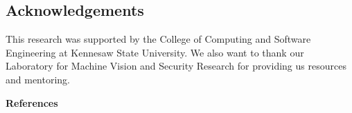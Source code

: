 \documentclass[a4paper,10pt]{article}
\begin{document}

\subsection*{Acknowledgements}
This research was supported by the College of Computing and Software Engineering
at Kennesaw State University. We also want to thank our Laboratory for Machine
Vision and Security Research for providing us resources and mentoring.

\vspace{5mm}

\begin{center}
      {\large \bf References}
\end{center}



\end{document}
